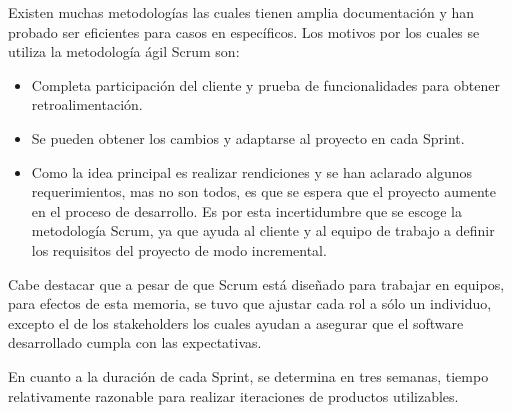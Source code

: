 Existen muchas metodologías las cuales tienen amplia documentación y han probado ser eficientes para casos en específicos. Los motivos por los cuales se utiliza la metodología ágil Scrum son:

\begin{itemize}
    \item Completa participación del cliente y prueba de funcionalidades para obtener retroalimentación.

    \item Se pueden obtener los cambios y adaptarse al proyecto en cada Sprint.

    \item Como la idea principal es realizar rendiciones y se han aclarado algunos requerimientos, mas no son todos, es que se espera que el proyecto aumente en el proceso de desarrollo. Es por esta incertidumbre que se escoge la metodología Scrum, ya que ayuda al cliente y al equipo de trabajo a definir los requisitos del proyecto de modo incremental.
\end{itemize}

Cabe destacar que a pesar de que Scrum está diseñado para trabajar en equipos, para efectos de esta memoria, se tuvo que ajustar cada rol a sólo un individuo, excepto el de los stakeholders los cuales ayudan a asegurar que el software desarrollado cumpla con las expectativas.

En cuanto a la duración de cada Sprint, se determina en tres semanas, tiempo relativamente razonable para realizar iteraciones de productos utilizables.

